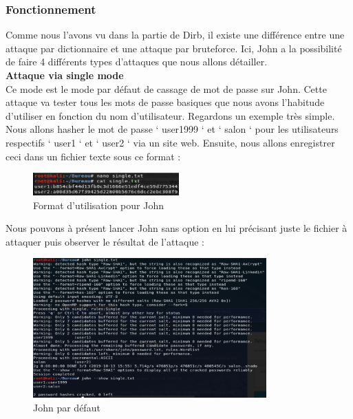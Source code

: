 \subsubsection{Fonctionnement}

Comme nous l’avons vu dans la partie de Dirb, il existe une différence entre une attaque par dictionnaire et une attaque par bruteforce. Ici, John a la possibilité de faire 4 différents types d’attaques que nous allons détailler.\\

 \textbf{Attaque via single mode}\\

Ce mode est le mode par défaut de cassage de mot de passe sur John. Cette attaque va tester tous les mots de passe basiques que nous avons l’habitude d’utiliser en fonction du nom d’utilisateur. Regardons un exemple très simple.
Nous allons hasher le mot de passe ‘ user1999 ‘ et ‘ salon ‘ pour les utilisateurs respectifs ‘ user1 ‘ et ‘ user2 ‘ via un site web.
Ensuite, nous allons enregistrer ceci dans un fichier texte sous ce format :

\begin{figure}[htp!]
  \centering
  \setlength\figureheight{7cm}
  \setlength\figurewidth{9cm}
  \includegraphics[width=0.5\textwidth]{oui/Ancien/imangeancien/john/format_txt.PNG}
  \caption{Format d'utilisation pour John}
  \label{fig:courbe-tikz}
\end{figure}

Nous pouvons à présent lancer John sans option en lui précisant juste le fichier à attaquer puis observer le résultat de l’attaque :

\begin{figure}[htp!]
  \centering
  \setlength\figureheight{7cm}
  \setlength\figurewidth{9cm}
  \includegraphics[width=0.8\textwidth]{oui/Ancien/imangeancien/john/affichage_mdp_single.PNG}
  \caption{John par défaut}
  \label{fig:courbe-tikz}
\end{figure}

